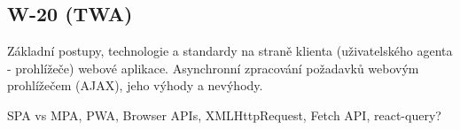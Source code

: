 \subsection{W-20 (TWA)}
Základní postupy, technologie a standardy na straně klienta (uživatelského agenta - prohlížeče) webové aplikace. Asynchronní zpracování požadavků webovým prohlížečem (AJAX), jeho výhody a nevýhody.

SPA vs MPA, PWA, Browser APIs, XMLHttpRequest, Fetch API, react-query? 
